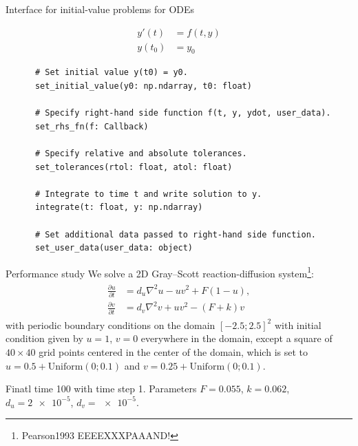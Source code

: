\documentclass[10pt, aspectratio=169, progressbar=frametitle]{beamer}
\begin{document}
\begin{frame}[fragile]{Interface for initial-value problems for ODEs}
  \begin{minipage}{\dimexpr0.22\textwidth-2\tabcolsep}
    \begin{align*}
      y'(t)  & = f(t, y) \\
      y(t_0) & = y_0
    \end{align*}
  \end{minipage}
  \begin{minipage}{\dimexpr0.73\textwidth-2\tabcolsep}
    \begin{verbatim}
      # Set initial value y(t0) = y0.
      set_initial_value(y0: np.ndarray, t0: float)

      # Specify right-hand side function f(t, y, ydot, user_data).
      set_rhs_fn(f: Callback)

      # Specify relative and absolute tolerances.
      set_tolerances(rtol: float, atol: float)

      # Integrate to time t and write solution to y.
      integrate(t: float, y: np.ndarray)

      # Set additional data passed to right-hand side function.
      set_user_data(user_data: object)
    \end{verbatim}
  \end{minipage}
\end{frame}

\begin{frame}{Performance study}
We solve a 2D Gray--Scott reaction-diffusion system\footnote{Pearson1993 EEEEXXXPAAAND!}:
\begin{align*}\label{eq:gs-system}
\begin{split}
\frac{\partial u}{\partial t} &= d_u \nabla^2 u - u v^2 + F (1 - u), \\
\frac{\partial v}{\partial t} &= d_v \nabla^2 v + u v^2 - (F + k) v
\end{split}
\end{align*}
with periodic boundary conditions on the domain $[-2.5; 2.5]^2$ with initial
condition given by \(u = 1\), \(v = 0\) everywhere in the domain, except
a square of \(40 \times 40\) grid points  centered in the center of the domain,
which is set to \(u = 0.5 + \mathrm{Uniform}(0; 0.1)\)
and \(v = 0.25 + \mathrm{Uniform}(0; 0.1)\).

Finatl time 100 with time step 1.
Parameters \(F = 0.055\), \(k = 0.062\), \(d_u = \num{2e-5}\),
\(d_v = \num{e-5}\).

\end{frame}
\end{document}
